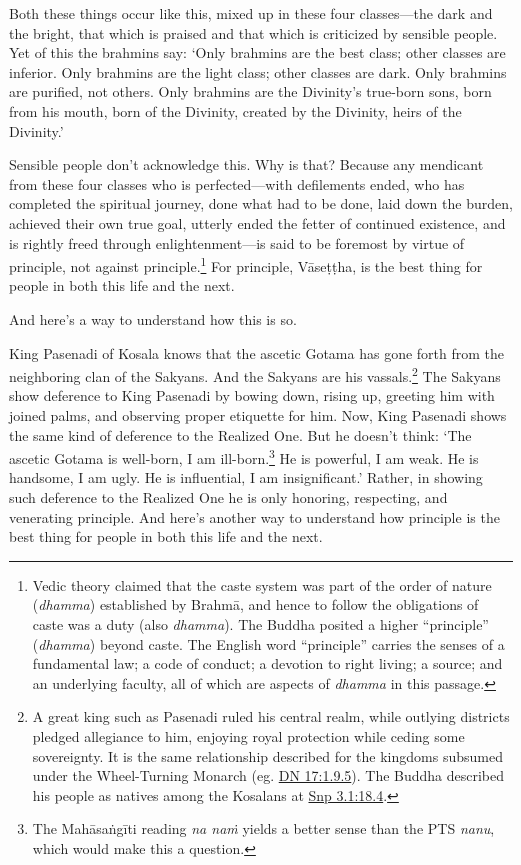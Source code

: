 \documentclass[12pt,openany]{book}%
\begin{document}
Both these things occur like this, mixed up in these four classes—the dark and the bright, that which is praised and that which is criticized by sensible people. Yet of this the brahmins say: ‘Only brahmins are the best class; other classes are inferior. Only brahmins are the light class; other classes are dark. Only brahmins are purified, not others. Only brahmins are the Divinity’s true-born sons, born from his mouth, born of the Divinity, created by the Divinity, heirs of the Divinity.’ 

Sensible people don’t acknowledge this. Why is that? Because any mendicant from these four classes who is perfected—with defilements ended, who has completed the spiritual journey, done what had to be done, laid down the burden, achieved their own true goal, utterly ended the fetter of continued existence, and is rightly freed through enlightenment—is said to be foremost by virtue of principle, not against principle.\footnote{Vedic theory claimed that the caste system was part of the order of nature (\textit{dhamma}) established by \textsanskrit{Brahmā}, and hence to follow the obligations of caste was a duty (also \textit{dhamma}). The Buddha posited a higher “principle” (\textit{dhamma}) beyond caste. The English word “principle” carries the senses of a fundamental law; a code of conduct; a devotion to right living; a source; and an underlying faculty, all of which are aspects of \textit{dhamma} in this passage. } For principle, \textsanskrit{Vāseṭṭha}, is the best thing for people in both this life and the next. 

And here’s a way to understand how this is so. 

King Pasenadi of Kosala knows that the ascetic Gotama has gone forth from the neighboring clan of the Sakyans. And the Sakyans are his vassals.\footnote{A great king such as Pasenadi ruled his central realm, while outlying districts pledged allegiance to him, enjoying royal protection while ceding some sovereignty. It is the same relationship described for the kingdoms subsumed under the Wheel-Turning Monarch (eg. \href{https://suttacentral.net/dn17/en/sujato\#1.9.5}{DN 17:1.9.5}). The Buddha described his people as natives among the Kosalans at \href{https://suttacentral.net/snp3.1/en/sujato\#18.4}{Snp 3.1:18.4}. } The Sakyans show deference to King Pasenadi by bowing down, rising up, greeting him with joined palms, and observing proper etiquette for him. Now, King Pasenadi shows the same kind of deference to the Realized One. But he doesn’t think: ‘The ascetic Gotama is well-born, I am ill-born.\footnote{The \textsanskrit{Mahāsaṅgīti} reading \textit{na \textsanskrit{naṁ}} yields a better sense than the PTS \textit{nanu}, which would make this a question. } He is powerful, I am weak. He is handsome, I am ugly. He is influential, I am insignificant.’ Rather, in showing such deference to the Realized One he is only honoring, respecting, and venerating principle. And here’s another way to understand how principle is the best thing for people in both this life and the next. 
\end{document}
